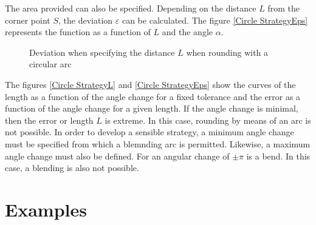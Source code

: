 The area provided can also be specified. Depending on the distance $L$ from the corner point $S$, the deviation $\varepsilon$ can be calculated. The figure \ref{Circle StrategyEps} represents the function as a function of $L$ and the angle $\alpha$.



 
\begin{figure}
  \begin{center}
  \end{center}
  \caption{Deviation when specifying the distance $L$ when rounding with a circular arc}\label{KreisstrategieEps}
\end{figure}


The figures \ref{Circle StrategyL} and \ref{Circle StrategyEps} show the curves of the length as a function of the angle change for a fixed tolerance and the error as a function of the angle change for a given length. If the angle change is minimal, then the error or length $L$ is extreme. In this case, rounding by means of an arc is not possible. In order to develop a sensible strategy, a minimum angle change must be specified from which a blemnding arc is permitted. Likewise, a maximum angle change must also be defined. For an angular change of $\pm \pi$ is a bend. In this case, a blending is also not possible.




\section{Examples}

